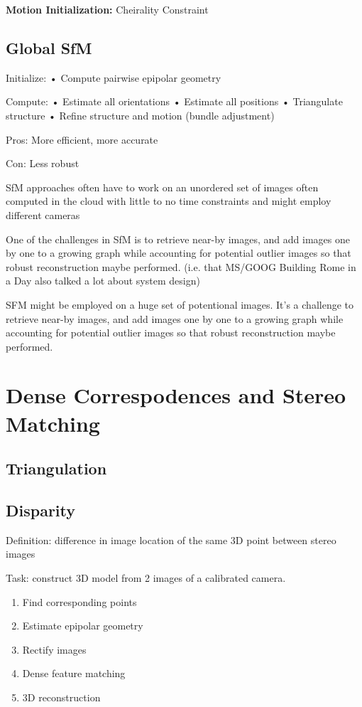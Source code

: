 \textbf{Motion Initialization:} Cheirality Constraint

\subsection{Global SfM}

Initialize:
• Compute pairwise epipolar geometry

Compute:
• Estimate all orientations
• Estimate all positions
• Triangulate structure
• Refine structure and motion (bundle adjustment)

Pros: More efficient, more accurate 

Con: Less robust

SfM approaches often have to work on an unordered set of images often computed in the cloud with little to no time constraints and might employ different cameras

One of the challenges in SfM is to retrieve near-by images, and add images one by one to a growing graph while accounting for potential outlier images so that robust reconstruction maybe performed. (i.e. that MS/GOOG Building  Rome in a Day also talked a lot about system design)

SFM might be employed on a huge set of potentional images. It's a challenge to retrieve near-by images, and add images one by one to a growing graph while accounting for potential outlier images so that robust reconstruction maybe performed. 

\section{Dense Correspodences and Stereo Matching}

\subsection{Triangulation}


\subsection{Disparity}
Definition: difference in image location of the same 3D point between stereo images

Task: construct 3D model from 2 images of a calibrated camera.

\begin{enumerate}
\item Find corresponding points
\item Estimate epipolar geometry
\item Rectify images
\item Dense feature matching
\item 3D reconstruction
\end{enumerate}

